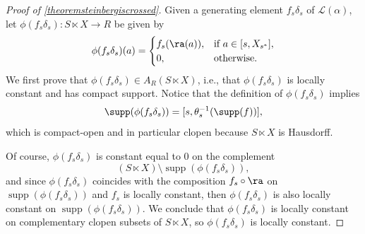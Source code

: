 \begin{proof}[Proof of \ref{theoremsteinbergiscrossed}]

Given a generating element $f_s\delta_s$ of $\mathscr{L}(\alpha)$, let $\phi(f_s\delta_s):S\ltimes X\to R$ be given by
\[\phi(f_s\delta_s)(a)=\begin{cases}
                          f_s(\ra(a)),&\text{if } a \in [s,X_{s^*}],\\
                                    0,&\text{otherwise.}
                        \end{cases}\]
We first prove that $\phi(f_s\delta_s)\in A_R(S\ltimes X)$, i.e., that $\phi(f_s\delta_s)$ is locally constant and has compact support. Notice that the definition of $\phi(f_s\delta_s)$ implies
\[\supp(\phi(f_s\delta_s))=[s,\theta_s^{-1}(\supp(f))],\]
which is compact-open and in particular clopen because $S\ltimes X$ is Hausdorff.

Of course, $\phi(f_s\delta_s)$ is constant equal to $0$ on the complement
\[(S\ltimes X)\setminus\operatorname{supp}(\phi(f_s\delta_s)),\]
and since $\phi(f_s\delta_s)$ coincides with the composition $f_s\circ\ra$ on $\operatorname{supp}(\phi(f_s\delta_s))$ and $f_s$ is locally constant, then $\phi(f_s\delta_s)$ is also locally constant on $\operatorname{supp}(\phi(f_s\delta_s))$. We conclude that $\phi(f_s\delta_s)$ is locally constant on complementary clopen subsets of $S\ltimes X$, so $\phi(f_s\delta_s)$ is locally constant.


\end{proof}
